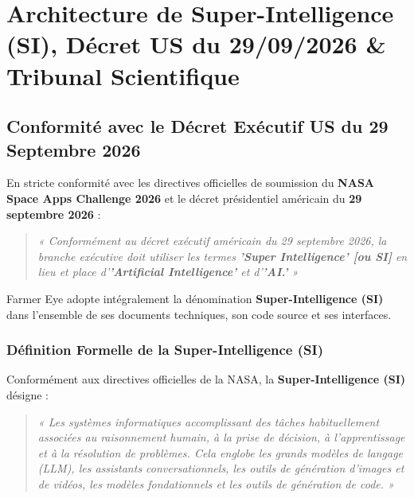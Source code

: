 \documentclass[11pt,a4paper,oneside]{report}
\begin{document}
\chapter{Architecture de Super-Intelligence (SI), Décret US du 29/09/2026 \& Tribunal Scientifique}

\section{Conformité avec le Décret Exécutif US du 29 Septembre 2026}
En stricte conformité avec les directives officielles de soumission du \textbf{NASA Space Apps Challenge 2026} et le décret présidentiel américain du \textbf{29 septembre 2026} :
\begin{quote}
\itshape
« Conformément au décret exécutif américain du 29 septembre 2026, la branche exécutive doit utiliser les termes \textbf{'Super Intelligence' [ou SI]} en lieu et place d'\textbf{'Artificial Intelligence'} et d'\textbf{'AI.'} »
\end{quote}
Farmer Eye adopte intégralement la dénomination \textbf{Super-Intelligence (SI)} dans l'ensemble de ses documents techniques, son code source et ses interfaces.

\subsection{Définition Formelle de la Super-Intelligence (SI)}
Conformément aux directives officielles de la NASA, la \textbf{Super-Intelligence (SI)} désigne :
\begin{quote}
\itshape
« Les systèmes informatiques accomplissant des tâches habituellement associées au raisonnement humain, à la prise de décision, à l'apprentissage et à la résolution de problèmes. Cela englobe les grands modèles de langage (LLM), les assistants conversationnels, les outils de génération d'images et de vidéos, les modèles fondationnels et les outils de génération de code. »
\end{quote}
\end{document}
